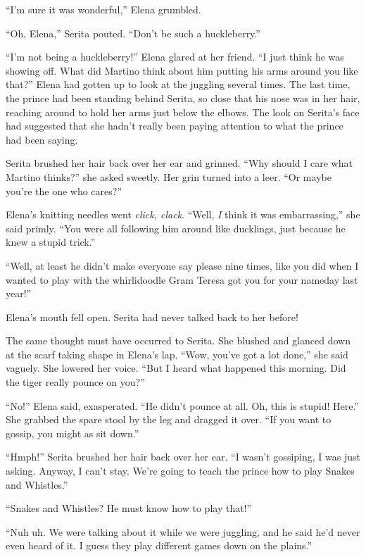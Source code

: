 \documentclass[10pt]{book}
\begin{document}
``I'm sure it was wonderful,'' Elena grumbled.

``Oh, Elena,'' Serita pouted. ``Don't be such a huckleberry.''

``I'm not being a huckleberry!'' Elena glared at her friend. ``I just think he was showing off. What did Martino think about him putting his arms around you like that?'' Elena had gotten up to look at the juggling several times. The last time, the prince had been standing behind Serita, so close that his nose was in her hair, reaching around to hold her arms just below the elbows. The look on Serita's face had suggested that she hadn't really been paying attention to what the prince had been saying.

Serita brushed her hair back over her ear and grinned. ``Why should I care what Martino thinks?'' she asked sweetly. Her grin turned into a leer. ``Or maybe you're the one who cares?''

Elena's knitting needles went \emph{click, clack}. ``Well, \emph{I} think it was embarrassing,'' she said primly. ``You were all following him around like ducklings, just because he knew a stupid trick.''

``Well, at least he didn't make everyone say please nine times, like you did when I wanted to play with the whirlidoodle Gram Teresa got you for your nameday last year!''

Elena's mouth fell open. Serita had never talked back to her before!

The same thought must have occurred to Serita. She blushed and glanced down at the scarf taking shape in Elena's lap. ``Wow, you've got a lot done,'' she said vaguely. She lowered her voice. ``But I heard what happened this morning. Did the tiger really pounce on you?''

``No!'' Elena said, exasperated. ``He didn't pounce at all. Oh, this is stupid! Here.'' She grabbed the spare stool by the leg and dragged it over. ``If you want to gossip, you might as sit down.''

``Hmph!'' Serita brushed her hair back over her ear. ``I wasn't gossiping, I was just asking. Anyway, I can't stay. We're going to teach the prince how to play Snakes and Whistles.''

``Snakes and Whistles? He must know how to play that!''

``Nuh uh. We were talking about it while we were juggling, and he said he'd never even heard of it. I guess they play different games down on the plains.''
\end{document}
